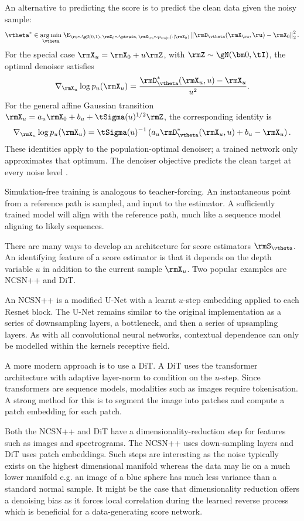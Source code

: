 An alternative to predicting the score is to predict the clean data given the noisy sample:
\[
\vtheta^\ast\in\underset{\vtheta}{\arg\min}\;\E_{\ru\sim\gU(0,1),\,\rmX_0\sim\ptrain,\,\rmX_\ru\sim p_{\ru|0}(\cdot|\rmX_0)}\left\lVert\rmD_\vtheta(\rmX_\ru,\ru)-\rmX_0\right\rVert_2^2.
\]
For the special case $\rmX_u=\rmX_0+u\rmZ$, with $\rmZ\sim\gN(\bm0,\tI)$, the optimal denoiser satisfies
\[
\nabla_{\rmX_u}\log p_u(\rmX_u)=\frac{\rmD^*_\vtheta(\rmX_u,u)-\rmX_u}{u^2}.
\]
For the general affine Gaussian transition $\rmX_u=a_u\rmX_0+b_u+\tSigma(u)^{1/2}\rmZ$, the corresponding identity is
\[
\nabla_{\rmX_u}\log p_u(\rmX_u)=\tSigma(u)^{-1}\left(a_u\rmD^*_\vtheta(\rmX_u,u)+b_u-\rmX_u\right).
\]
These identities apply to the population-optimal denoiser; a trained network only approximates that optimum. The denoiser objective predicts the clean target at every noise level \citep{karras2022elucidating}.

Simulation-free training is analogous to teacher-forcing. An instantaneous point from a reference path is sampled, and input to the estimator. A sufficiently trained model will align with the reference path, much like a sequence model aligning to likely sequences.


There are many ways to develop an architecture for score estimators $\rmS_\vtheta$. An identifying feature of a score estimator is that it depends on the depth variable $u$ in addition to the current sample $\rmX_u$. Two popular examples are NCSN++ and DiT. 

An NCSN++ is a modified U-Net \citep{ronneberger2015unet} with a learnt $u$-step embedding applied to each Resnet block. The U-Net remains similar to the original implementation as a series of downsampling layers, a bottleneck, and then a series of upsampling layers. As with all convolutional neural networks, contextual dependence can only be modelled within the kernels receptive field.

A more modern approach is to use a DiT. A DiT uses the transformer architecture with adaptive layer-norm to condition on the $u$-step. Since transformers are sequence models, modalities such as images require tokenisation. A strong method for this is to segment the image into patches and compute a patch embedding for each patch.

Both the NCSN++ and DiT have a dimensionality-reduction step for features such as images and spectrograms. The NCSN++ uses down-sampling layers and DiT uses patch embeddings. Such steps are interesting as the noise typically exists on the highest dimensional manifold whereas the data may lie on a much lower manifold e.g. an image of a blue sphere has much less variance than a standard normal sample. It might be the case that dimensionality reduction offers a denoising bias as it forces local correlation during the learned reverse process which is beneficial for a data-generating score network.


